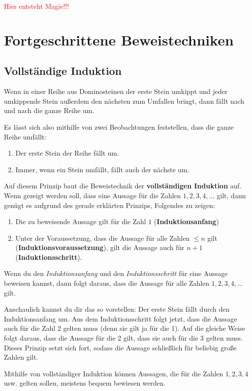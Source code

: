 \documentclass[../../main.tex]{subfiles}
\begin{document}
    \textcolor{red}{Hier entsteht Magie!!!}
    \section*{Fortgeschrittene Beweistechniken}
    
    \subsection{Vollständige Induktion}
    Wenn in einer Reihe aus Dominosteinen der erste Stein umkippt und jeder umkippende Stein außerdem den nächsten zum Umfallen bringt, dann fällt nach und nach die ganze Reihe um.

    Es lässt sich also mithilfe von zwei Beobachtungen feststellen, dass die ganze Reihe umfällt:
    \begin{enumerate}
        \item Der erste Stein der Reihe fällt um.
        \item Immer, wenn ein Stein umfällt, fällt auch der nächste um.
    \end{enumerate}
    Auf diesem Prinzip baut die Beweistechnik der \textbf{vollständigen Induktion} auf. Wenn gezeigt werden soll, dass eine Aussage für die Zahlen $1,2,3,4,\dots$ gilt, dann genügt es aufgrund des gerade erklärten Prinzips, Folgendes zu zeigen:
    \begin{enumerate}
        \item Die zu beweisende Aussage gilt für die Zahl $1$ (\textbf{Induktionsanfang})
        \item Unter der Voraussetzung, dass die Aussage für alle Zahlen $\leq n$ gilt (\textbf{In\-duk\-tions\-voraus\-setzung}), gilt die Aussage auch für $n+1$ (\textbf{Induktionsschritt}).
    \end{enumerate}
    Wenn du den \emph{Induktionsanfang} und den \emph{Induktionsschritt} für eine Aussage beweisen kannst, dann folgt daraus, dass die Aussage für alle Zahlen $1,2,3,4,\dots$ gilt.
    
    Anschaulich kannst du dir das so vorstellen: Der erste Stein fällt durch den Induktionsanfang um. Aus dem Induktionsschritt folgt jetzt, dass die Aussage auch für die Zahl 2 gelten muss (denn sie gilt ja für die 1). Auf die gleiche Weise folgt daraus, dass die Aussage für die 2 gilt, dass sie auch für die 3 gelten muss. Dieses Prinzip setzt sich fort, sodass die Aussage schließlich für beliebig große Zahlen gilt.
    
    Mithilfe von vollständiger Induktion können Aussagen, die für die Zahlen $1,2,3,4$ usw. gelten sollen, meistens bequem bewiesen werden.
\end{document}
